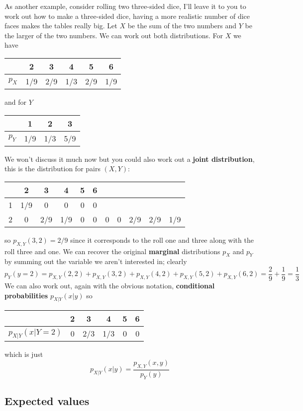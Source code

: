 \documentclass[11pt,a4paper]{scrartcl}
\begin{document}
As another example, consider rolling two three-sided dice, I'll leave it to you to work
out how to make a three-sided dice, having a more realistic number of
dice faces makes the tables really big. Let $X$ be the sum of the two
numbers and $Y$ be the larger of the two numbers. We can work out both
distributions. For $X$ we have
\begin{center}
\begin{tabular}{c|ccccc}
&2&3&4&5&6\\
\hline
$p_X$&1/9&2/9&1/3&2/9&1/9
\end{tabular}
\end{center}
and for $Y$
\begin{center}
\begin{tabular}{c|ccc}
&1&2&3\\
\hline
$p_Y$&1/9&1/3&5/9
\end{tabular}
\end{center}
We won't discuss it much now but you could also work out a \textbf{joint distribution}, this is the
distribution for pairs $(X,Y)$:
\begin{center}
\begin{tabular}{c|ccccc}
&2&3&4&5&6\\
&  1/9&0&0&0&0\\
2&  0&2/9&1/9&0&0&  0&0&2/9&2/9&1/9
\end{tabular}
\end{center}
so $p_{X,Y}(3,2)=2/9$ since it corresponds to the roll one and three
along with the roll three and one. We can recover the original
\textbf{marginal} distributions $p_X$ and $p_Y$ by summing out the
variable we aren't interested in; clearly
\begin{equation}
p_Y(y=2)=p_{X,Y}(2,2)+p_{X,Y}(3,2)+p_{X,Y}(4,2)+p_{X,Y}(5,2)+p_{X,Y}(6,2)=\frac{2}{9}+\frac{1}{9}=\frac{1}{3}
\end{equation}
We can also work out, again with the obvious notation, \textbf{conditional probabilities} $p_{X|Y}(x|y)$ so
\begin{center}
\begin{tabular}{c|ccccc}
&2&3&4&5&6\\
\hline
$p_{X|Y}(x|Y=2)$&0&2/3&1/3&0&0
\end{tabular}
\end{center}
which is just
\begin{equation}
p_{X|Y}(x|y)=\frac{p_{X,Y}(x,y)}{p_Y(y)}
\end{equation}

\subsection*{Expected values}
\end{document}
